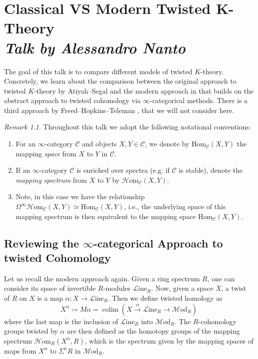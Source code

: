 \documentclass[a4paper]{book}
\newcommand{\lC}{\mathcal{C}}
\newcommand{\lH}{\mathcal{H}}
\newcommand{\lL}{\mathcal{L}}
\newcommand{\lM}{\mathcal{M}}
\newcommand{\Hom}{\lH\mathrm{om}} %
\renewcommand{\hom}{\mathrm{Hom}} %
\renewcommand{\Line}{\lL\mathrm{ine}} %
\newcommand{\Mod}{\lM\mathrm{od}} %
\DeclareMathOperator*\colim{colim} %
\theoremstyle{definition}
\theoremstyle{remark}
\newtheorem{remark}[equation]{Remark}
\numberwithin{equation}{section}
\begin{document}
\chapter{Classical VS Modern Twisted K-Theory \texorpdfstring{\\}{ } \normalsize \emph{Talk by Alessandro Nanto}}

The goal of this talk is to compare different models of twisted $K$-theory. Concretely, we learn about the comparison between the original approach to twisted $K$-theory by Atiyah--Segal \cite{atiyahsegal2004twistedktheory} and the modern approach in \cite{abghr2014infty} that builds on the abstract approach to twisted cohomology via $\infty$-categorical methods. There is a third approach by Freed--Hopkins--Teleman \cite{freedhopkinsteleman2011loopgroupsi}, that we will not consider here.

\begin{remark}
	Throughout this talk we adopt the following notational conventions:
	\begin{enumerate}
		\item For an $\infty$-category $\lC$ and objects $X,Y \in \lC$, we denote by $\hom_{\lC}(X,Y)$ the mapping \emph{space} from $X$ to $Y$ in $\lC$. 
		\item If an $\infty$-category $\lC$ is enriched over spectra (e.g. if $\lC$ is stable), denote the \emph{mapping	spectrum} from $X$ to $Y$ by $\Hom_{\lC}(X,Y)$. 
  \item Note, in this case we have the relationship $\Omega^{\infty} \Hom_{\lC}(X,Y) \simeq \hom_{\lC}(X,Y)$, i.e., the underlying space of this mapping spectrum is then equivalent to the mapping space $\hom_{\lC}(X,Y)$.
	\end{enumerate}
\end{remark}

\section{Reviewing the \texorpdfstring{$\infty$}{oo}-categorical Approach to twisted Cohomology}
Let us recall the modern approach again. Given a ring spectrum	$R$, one can consider its space of invertible $R$-modules $\Line_R$. Now, given a space $X$, a twist of $R$ on $X$ is a map $\alpha \colon X \to \Line_R$. Then we define twisted homology as
\[X^\alpha \coloneq M \alpha = \colim (X \xrightarrow{ \ \alpha \ } \Line_R \to \Mod_R) \]
where the last map is the inclusion of $\Line_R$ into $\Mod_R$. The $R$-cohomology groups twisted by $\alpha$ are then defined as the homotopy groups of the mapping spectrum $\Hom_R(X^\alpha,  R)$, which is the spectrum given by the mapping spaces of maps from $X^\alpha$ to $\Sigma^n R$	in $\Mod_R$.
\end{document}
